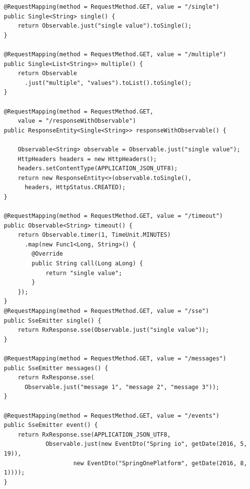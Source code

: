 \begin{verbatim}
@RequestMapping(method = RequestMethod.GET, value = "/single")
public Single<String> single() {
    return Observable.just("single value").toSingle();
}

@RequestMapping(method = RequestMethod.GET, value = "/multiple")
public Single<List<String>> multiple() {
    return Observable
      .just("multiple", "values").toList().toSingle();
}

@RequestMapping(method = RequestMethod.GET, 
    value = "/responseWithObservable")
public ResponseEntity<Single<String>> responseWithObservable() {

    Observable<String> observable = Observable.just("single value");
    HttpHeaders headers = new HttpHeaders();
    headers.setContentType(APPLICATION_JSON_UTF8);
    return new ResponseEntity<>(observable.toSingle(), 
      headers, HttpStatus.CREATED);
}

@RequestMapping(method = RequestMethod.GET, value = "/timeout")
public Observable<String> timeout() {
    return Observable.timer(1, TimeUnit.MINUTES)
      .map(new Func1<Long, String>() {
        @Override
        public String call(Long aLong) {
            return "single value";
        }
    });
}
@RequestMapping(method = RequestMethod.GET, value = "/sse")
public SseEmitter single() {
	return RxResponse.sse(Observable.just("single value"));
}

@RequestMapping(method = RequestMethod.GET, value = "/messages")
public SseEmitter messages() {
	return RxResponse.sse(
      Observable.just("message 1", "message 2", "message 3"));
}

@RequestMapping(method = RequestMethod.GET, value = "/events")
public SseEmitter event() {
	return RxResponse.sse(APPLICATION_JSON_UTF8,
			Observable.just(new EventDto("Spring io", getDate(2016, 5, 19)),
					new EventDto("SpringOnePlatform", getDate(2016, 8, 1))));
}
\end{verbatim}